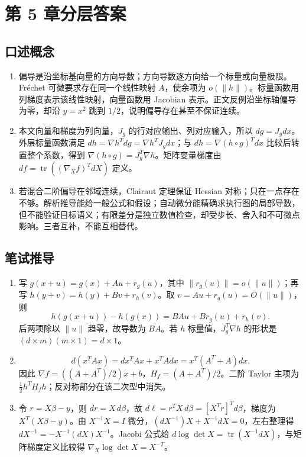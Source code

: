 \chapter{第 5 章分层答案}
\label{app:ch05-solutions}

\section*{口述概念}
\begin{enumerate}[leftmargin=*]
  \item 偏导是沿坐标基向量的方向导数；方向导数逐方向给一个标量或向量极限。Fréchet 可微要求存在同一个线性映射 $A$，使余项为 $o(\lVert h\rVert)$。标量函数用列梯度表示该线性映射，向量函数用 Jacobian 表示。正文反例沿坐标轴偏导为零，却沿 $y=x^2$ 跳到 $1/2$，说明偏导存在甚至不保证连续。
  \item 本文向量和梯度为列向量，$J_g$ 的行对应输出、列对应输入，所以 $dg=J_gdx$。外层标量函数满足 $dh=\nabla h^Tdg=\nabla h^TJ_gdx$；与 $dh=\nabla(h\circ g)^Tdx$ 比较后转置整个系数，得到 $\nabla(h\circ g)=J_g^T\nabla h$。矩阵变量梯度由 $df=\operatorname{tr}((\nabla_Xf)^TdX)$ 定义。
  \item 若混合二阶偏导在邻域连续，Clairaut 定理保证 Hessian 对称；只在一点存在不够。解析推导能给一般公式和假设；自动微分能精确求执行图的局部导数，但不能验证目标语义；有限差分是独立数值检查，却受步长、舍入和不可微点影响。三者互补，不能互相替代。
\end{enumerate}

\section*{笔试推导}
\begin{enumerate}[leftmargin=*]
  \item 写 $g(x+u)=g(x)+Au+r_g(u)$，其中 $\lVert r_g(u)\rVert=o(\lVert u\rVert)$；再写 $h(y+v)=h(y)+Bv+r_h(v)$。取 $v=Au+r_g(u)=O(\lVert u\rVert)$，则
  \[
   h(g(x+u))-h(g(x))=BAu+B r_g(u)+r_h(v).
  \]
  后两项除以 $\lVert u\rVert$ 趋零，故导数为 $BA$。若 $h$ 标量值，$J_g^T\nabla h$ 的形状是 $(d\times m)(m\times1)=d\times1$。
  \item
  \[
   d(x^TAx)=dx^TAx+x^TAdx=x^T(A^T+A)dx.
  \]
  因此 $\nabla f=((A+A^T)/2)x+b$，$H_f=(A+A^T)/2$。二阶 Taylor 主项为 $\tfrac12h^TH_fh$；反对称部分在该二次型中消失。
  \item 令 $r=X\beta-y$，则 $dr=X\,d\beta$，故 $d\ell=r^TX\,d\beta=[X^Tr]^Td\beta$，梯度为 $X^T(X\beta-y)$。由 $X^{-1}X=I$ 微分，$(dX^{-1})X+X^{-1}dX=0$，左右整理得 $dX^{-1}=-X^{-1}(dX)X^{-1}$。Jacobi 公式给 $d\log\det X=\operatorname{tr}(X^{-1}dX)$，与矩阵梯度定义比较得 $\nabla_X\log\det X=X^{-T}$。
\end{enumerate}

